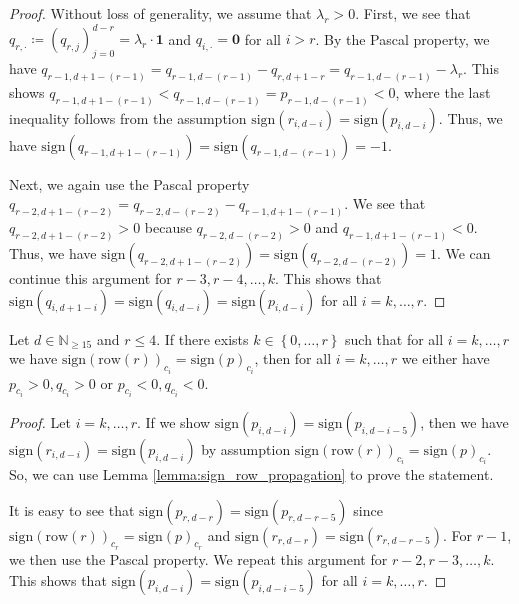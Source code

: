 \begin{proof}
    Without loss of generality, we assume that \( \lambda_r > 0 \).
    First, we see that \( q_{r, \cdot} \coloneqq (q_{r,j})_{j=0}^{d-r} = \lambda_r \cdot \mathbf{1} \) and \( q_{i,\cdot} =  \mathbf{0} \) for all \( i > r \). By the Pascal property, we have \( q_{r-1,d+1-(r-1)} = q_{r-1,d-(r-1)} - q_{r,d+1-r} = q_{r-1,d-(r-1)} - \lambda_r \).
    This shows \( q_{r-1,d+1-(r-1)} < q_{r-1,d-(r-1)} = p_{r-1,d-(r-1)} < 0 \), where the last inequality follows from the assumption $\mathrm{sign}(r_{i,d-i}) = \mathrm{sign}(p_{i,d-i})$. Thus, we have \( \mathrm{sign}(q_{r-1,d+1-(r-1)}) = \mathrm{sign}(q_{r-1,d-(r-1)}) = \mathbf -1\). 
    
    Next, we again use the Pascal property \( q_{r-2,d+1-(r-2)} = q_{r-2,d-(r-2)} - q_{r-1,d+1-(r-1)} \). We see that \( q_{r-2,d+1-(r-2)} > 0 \) because \( q_{r-2,d-(r-2)} > 0 \) and \( q_{r-1,d+1-(r-1)} < 0 \). Thus, we have \( \mathrm{sign}(q_{r-2,d+1-(r-2)}) = \mathrm{sign}(q_{r-2,d-(r-2)}) = 1 \). We can continue this argument for \( r-3, r-4, \dots, k \). This shows that \( \mathrm{sign}(q_{i,d+1-i}) = \mathrm{sign}(q_{i,d-i}) = \mathrm{sign}(p_{i,d-i}) \) for all \( i = k, \dots, r\).
\end{proof}

\begin{lemma}\label{lemma:same_sign_propagation_easy}
    Let \( d \in \mathbb{N}_{\geq 15} \) and \( r \leq 4 \). If there exists \( k \in \left\{ 0, \dots, r \right\} \) such that for all \( i = k, \dots, r\) we have \(  \mathrm{sign}(\mathrm{row}(r))_{c_i} = \mathrm{sign}(p)_{c_i} \),
    then for all \( i = k, \dots, r\) we either have \( p_{c_i} > 0, q_{c_i} > 0 \) or \( p_{c_i} < 0, q_{c_i} < 0 \).
\end{lemma}
  
\begin{proof}
    Let \( i=k, \dots, r \). If we show \( \mathrm{sign}(p_{i,d-i}) = \mathrm{sign}(p_{i,d-i-5}) \), then we have $\mathrm{sign}(r_{i,d-i}) = \mathrm{sign}(p_{i,d-i})$ by assumption \( \mathrm{sign}(\mathrm{row}(r))_{c_i} = \mathrm{sign}(p)_{c_i} \). So, we can use Lemma \ref{lemma:sign_row_propagation} to prove the statement.

    It is easy to see that \( \mathrm{sign}(p_{r,d-r}) = \mathrm{sign}(p_{r,d-r-5}) \) since \( \mathrm{sign}(\mathrm{row}(r))_{c_r} = \mathrm{sign}(p)_{c_r} \) and \( \mathrm{sign}(r_{r,d-r}) = \mathrm{sign}(r_{r, d - r - 5}) \). For \( r - 1 \), we then use the Pascal property. We repeat this argument for \( r-2, r-3, \dots, k \). This shows that \( \mathrm{sign}(p_{i,d-i}) = \mathrm{sign}(p_{i,d-i-5}) \) for all \( i = k, \dots, r \).
\end{proof}

